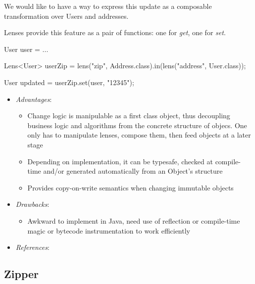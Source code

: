 \documentclass[11pt,]{article}
\newenvironment{Shaded}{}{}
\newcommand{\StringTok}[1]{\textcolor[rgb]{0.25,0.44,0.63}{{#1}}}
\newcommand{\FunctionTok}[1]{\textcolor[rgb]{0.02,0.16,0.49}{{#1}}}
\newcommand{\NormalTok}[1]{{#1}}
\begin{document}
We would like to have a way to express this update as a composable
transformation over Users and addresses.

Lenses provide this feature as a pair of functions: one for \emph{get},
one for \emph{set}.

\begin{Shaded}
\begin{Highlighting}[]
\NormalTok{User user = ...}

\NormalTok{Lens<User> userZip = }\FunctionTok{lens}\NormalTok{(}\StringTok{"zip"}\NormalTok{, Address.}\FunctionTok{class}\NormalTok{).}\FunctionTok{in}\NormalTok{(}\FunctionTok{lens}\NormalTok{(}\StringTok{"address"}\NormalTok{, User.}\FunctionTok{class}\NormalTok{));}

\NormalTok{User updated = userZip.}\FunctionTok{set}\NormalTok{(user, }\StringTok{"12345"}\NormalTok{);}
\end{Highlighting}
\end{Shaded}

\begin{itemize}
\item
  \emph{Advantages}:

  \begin{itemize}
  \item
    Change logic is manipulable as a first class object, thus decoupling
    business logic and algorithms from the concrete structure of objecs.
    One only has to manipulate lenses, compose them, then feed objects
    at a later stage
  \item
    Depending on implementation, it can be typesafe, checked at
    compile-time and/or generated automatically from an Object's
    structure
  \item
    Provides copy-on-write semantics when changing immutable objects
  \end{itemize}
\item
  \emph{Drawbacks}:

  \begin{itemize}
  \item
    Awkward to implement in Java, need use of reflection or compile-time
    magic or bytecode instrumentation to work efficiently
  \end{itemize}
\item
  \emph{References}:
\end{itemize}

\subsection{Zipper}
\end{document}
